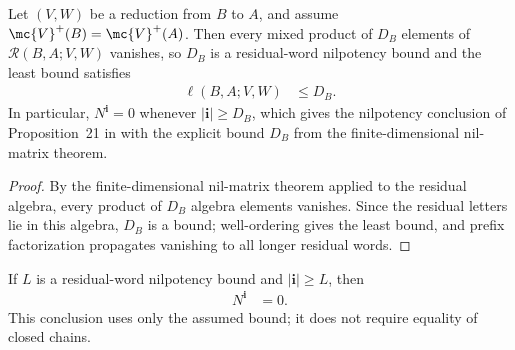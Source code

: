 \begin{lemma}
    \label{thm:mps_reduction_residual_dimension_bound}
    \leanok
    Let $(V,W)$ be a reduction from $B$ to $A$, and assume
    $\mc{V}^+(B)=\mc{V}^+(A)$.  Then every mixed product of $D_B$ elements of
    $\mathcal R(B,A;V,W)$ vanishes, so $D_B$ is a residual-word
    nilpotency bound and the least bound satisfies
    \begin{align}
        \ell(B,A;V,W) & \leq D_B.
        \label{eq:mps_reduction_residual_nilpotency_length_bound}
    \end{align}
    In particular, $N^{\mathbf i}=0$ whenever $|\mathbf i|\geq D_B$, which
    gives the nilpotency conclusion of Proposition~21 in
    \cite{Molnar2018SemiInjective} with the explicit bound $D_B$ from the
    finite-dimensional nil-matrix theorem.
\end{lemma}

\begin{proof}
    \leanok
    By the finite-dimensional nil-matrix theorem applied to the residual
    algebra, every product of $D_B$ algebra elements vanishes.  Since the
    residual letters lie in this algebra, $D_B$ is a bound; well-ordering gives
    the least bound, and prefix factorization propagates vanishing to all
    longer residual words.
\end{proof}

\begin{lemma}
    \label{thm:mps_reduction_residual_bound_consequences}
    \leanok
    If $L$ is a residual-word nilpotency bound and
    $|\mathbf i|\geq L$, then
    \begin{align}
        N^{\mathbf i} & =0.
        \label{eq:mps_reduction_residual_bound_word}
    \end{align}
    This conclusion uses only the assumed bound; it does not require equality
    of closed chains.
\end{lemma}

